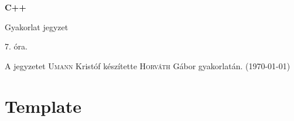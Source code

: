 \documentclass[a4paper,11.5pt,table]{article}
\begin{document}
	\setlength\parindent{0pt}
	\def\<{<\hspace{0mm}<}
	
	\theoremstyle{definition}
	\newtheorem{note}{Megjegyzés}[subsection]
	
	\begin{center}
		{\LARGE\textbf{C++}}
		
		{\Large Gyakorlat jegyzet}
		
		7. óra.
	\end{center}
	A jegyzetet \textsc{Umann} Kristóf készítette \textsc{Horváth} Gábor gyakorlatán. (\today)
	
	\section{Template}
\end{document}
